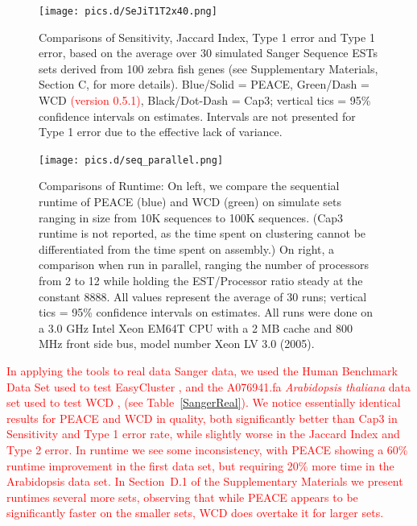 \documentclass[a4,center,fleqn]{NAR}
\newcommand{\mc}[1]{\textcolor{red}{#1}}
\newcommand{\peace} {{\small PEACE}}
\newcommand{\wcd} {{\small WCD}}
\newcommand{\capthree} {{\small Cap3}}
\newcommand{\easycluster} {{\small EasyCluster}}
\begin{document}
\begin{figure}
  \centerline{\texttt{[image: pics.d/SeJiT1T2x40.png]}}
  \caption{Comparisons of Sensitivity, Jaccard Index, Type 1 error and
    Type 1 error, based on the average over 30 simulated Sanger
    Sequence ESTs sets derived from 100 zebra fish genes (see
    Supplementary Materials, Section C, for more details).  Blue/Solid
    = \peace, Green/Dash = \wcd\/ \mc{(version 0.5.1)}, Black/Dot-Dash =
    \capthree; vertical tics = 95\% confidence intervals on estimates.
    Intervals are not presented for Type 1 error due to the effective
    lack of variance.}\label{SeJiT1T2}
\end{figure}

\begin{figure}
   \centerline{\texttt{[image: pics.d/seq\_parallel.png]}}
   \caption{Comparisons of Runtime: On left, we compare the sequential
     runtime of \peace\/ (blue) and \wcd\/ (green) on simulate sets
     ranging in size from 10K sequences to 100K sequences.  (\capthree\/
     runtime is not reported, as the time spent on clustering cannot
     be differentiated from the time spent on assembly.)  On right,
     a comparison when run in parallel, ranging the number of
     processors from 2 to 12 while holding the EST/Processor ratio
     steady at the constant 8888.  All values represent the average
     of 30 runs; vertical tics = 95\% confidence intervals on
     estimates.  All runs were done on a 3.0 GHz Intel Xeon EM64T CPU with a 2 MB
     cache and 800 MHz front side bus, model number Xeon LV 3.0 (2005).}\label{seq_parallel}
\end{figure}

\mc{In applying the tools to real data Sanger data, we used the Human
  Benchmark Data Set used to test \easycluster\/ \cite{Picardi09}, and
  the A076941.fa {\it Arabidopsis thaliana} data set used to test WCD
  \cite{Hazelhurst08a,Hazelhurst08b}, (see Table~\ref{SangerReal}).
  We notice essentially identical results for PEACE and WCD in
  quality, both significantly better than Cap3 in Sensitivity and Type
  1 error rate, while slightly worse in the Jaccard Index and Type 2
  error.  In runtime we see some inconsistency, with PEACE showing a
  60\% runtime improvement in the first data set, but requiring 20\%
  more time in the Arabidopsis data set.  In Section~D.1 of the
  Supplementary Materials we present runtimes several more sets,
  observing that while \peace\/ appears to be significantly 
  faster on the smaller sets, \wcd\/ does overtake it for larger
  sets.}
\end{document}
